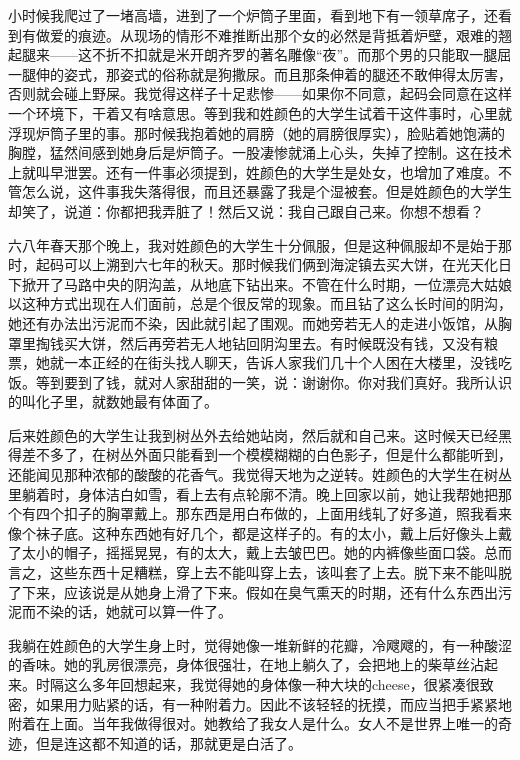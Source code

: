 小时候我爬过了一堵高墙，进到了一个炉筒子里面，看到地下有一领草席子，还看到有做爱的痕迹。从现场的情形不难推断出那个女的必然是背抵着炉壁，艰难的翘起腿来——这不折不扣就是米开朗齐罗的著名雕像“夜”。而那个男的只能取一腿屈一腿伸的姿式，那姿式的俗称就是狗撒尿。而且那条伸着的腿还不敢伸得太厉害，否则就会碰上野屎。我觉得这样子十足悲惨——如果你不同意，起码会同意在这样一个环境下，干着又有啥意思。等到我和姓颜色的大学生试着干这件事时，心里就浮现炉筒子里的事。那时候我抱着她的肩膀（她的肩膀很厚实），脸贴着她饱满的胸膛，猛然间感到她身后是炉筒子。一股凄惨就涌上心头，失掉了控制。这在技术上就叫早泄罢。还有一件事必须提到，姓颜色的大学生是处女，也增加了难度。不管怎么说，这件事我失落得很，而且还暴露了我是个湿被套。但是姓颜色的大学生却笑了，说道：你都把我弄脏了！然后又说：我自己跟自己来。你想不想看？ 

六八年春天那个晚上，我对姓颜色的大学生十分佩服，但是这种佩服却不是始于那时，起码可以上溯到六七年的秋天。那时候我们俩到海淀镇去买大饼，在光天化日下掀开了马路中央的阴沟盖，从地底下钻出来。不管在什么时期，一位漂亮大姑娘以这种方式出现在人们面前，总是个很反常的现象。而且钻了这么长时间的阴沟，她还有办法出污泥而不染，因此就引起了围观。而她旁若无人的走进小饭馆，从胸罩里掏钱买大饼，然后再旁若无人地钻回阴沟里去。有时候既没有钱，又没有粮票，她就一本正经的在街头找人聊天，告诉人家我们几十个人困在大楼里，没钱吃饭。等到要到了钱，就对人家甜甜的一笑，说：谢谢你。你对我们真好。我所认识的叫化子里，就数她最有体面了。 

后来姓颜色的大学生让我到树丛外去给她站岗，然后就和自己来。这时候天已经黑得差不多了，在树丛外面只能看到一个模模糊糊的白色影子，但是什么都能听到，还能闻见那种浓郁的酸酸的花香气。我觉得天地为之逆转。姓颜色的大学生在树丛里躺着时，身体洁白如雪，看上去有点轮廓不清。晚上回家以前，她让我帮她把那个有四个扣子的胸罩戴上。那东西是用白布做的，上面用线轧了好多道，照我看来像个袜子底。这种东西她有好几个，都是这样子的。有的太小，戴上后好像头上戴了太小的帽子，摇摇晃晃，有的太大，戴上去皱巴巴。她的内裤像些面口袋。总而言之，这些东西十足糟糕，穿上去不能叫穿上去，该叫套了上去。脱下来不能叫脱了下来，应该说是从她身上滑了下来。假如在臭气熏天的时期，还有什么东西出污泥而不染的话，她就可以算一件了。 

我躺在姓颜色的大学生身上时，觉得她像一堆新鲜的花瓣，冷飕飕的，有一种酸涩的香味。她的乳房很漂亮，身体很强壮，在地上躺久了，会把地上的柴草丝沾起来。时隔这么多年回想起来，我觉得她的身体像一种大块的cheese，很紧凑很致密，如果用力贴紧的话，有一种附着力。因此不该轻轻的抚摸，而应当把手紧紧地附着在上面。当年我做得很对。她教给了我女人是什么。女人不是世界上唯一的奇迹，但是连这都不知道的话，那就更是白活了。 

